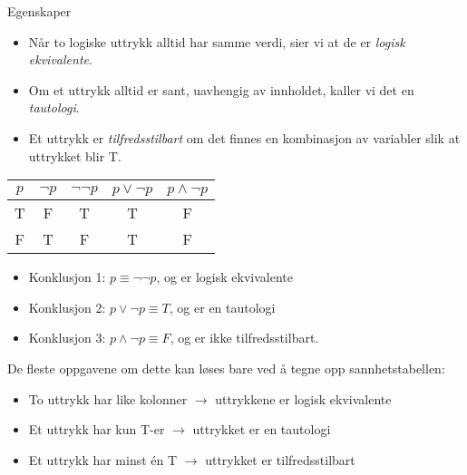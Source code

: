 \begin{frame}{Egenskaper}
    \begin{itemize}
        \item Når to logiske uttrykk alltid har samme verdi, sier vi at de er \emph{logisk ekvivalente}.
        \pause
        \item Om et uttrykk alltid er sant, uavhengig av innholdet, kaller vi det en \emph{tautologi}.
        \pause
        \item Et uttrykk er \emph{tilfredsstilbart} om det finnes en kombinasjon av variabler slik at uttrykket blir T.
    \end{itemize}
    \pause
    \begin{tabular}{c|c|c|c|c}
         $p$ & $\lnot p$ & $\lnot \lnot p$ & $p \lor \lnot p$ & $p \land \lnot p$\\ \hline
         T & F & T & T & F\\
         F & T & F & T & F
    \end{tabular}
    \pause
    \begin{itemize}
        \item Konklusjon 1: $p \equiv \lnot \lnot p$, og er logisk ekvivalente
        \pause
        \item Konklusjon 2: $p \lor \lnot p \equiv T$, og er en tautologi
        \pause
        \item Konklusjon 3: $p \land \lnot p \equiv F$, og er ikke tilfredsstilbart.
    \end{itemize}
    \pause
    De fleste oppgavene om dette kan løses bare ved å tegne opp sannhetstabellen:
    \begin{itemize}
        \item To uttrykk har like kolonner $\rightarrow$ uttrykkene er logisk ekvivalente
        \pause
        \item Et uttrykk har kun T-er $\rightarrow$ uttrykket er en tautologi
        \pause
        \item Et uttrykk har minst én T $\rightarrow$ uttrykket er tilfredsstilbart
    \end{itemize}
\end{frame}

